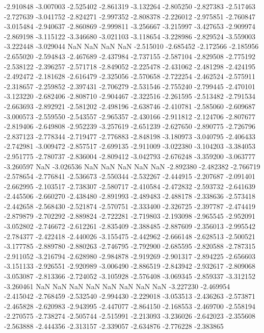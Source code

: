 -2.910848
-3.007003
-2.525402
-2.861319
-3.132264
-2.805250
-2.827383
-2.517463
-2.727639
-3.041752
-2.824271
-2.997352
-2.808378
-2.226012
-2.975851
-2.760847
-3.015484
-2.940637
-2.860869
-2.999811
-3.256667
-3.215997
-3.427653
-2.909974
-2.869198
-3.115122
-3.346680
-3.021103
-3.118654
-3.228986
-2.829524
-3.559003
-3.222448
-3.029044
NaN
NaN
NaN
NaN
-2.515010
-2.685452
-2.172566
-2.185956
-2.655020
-2.594843
-2.467689
-2.437984
-2.737155
-2.587104
-2.829508
-2.775192
-2.538122
-2.396257
-2.571718
-2.849052
-2.225478
-2.431062
-2.481298
-2.424195
-2.492472
-2.181628
-2.616479
-2.325056
-2.570658
-2.722254
-2.462524
-2.575911
-2.318657
-2.259852
-2.397431
-2.706279
-2.531546
-2.755240
-2.799445
-2.470101
-3.123220
-2.682406
-2.808710
-2.904467
-2.322516
-2.261595
-2.513482
-2.791534
-2.663693
-2.892921
-2.581202
-2.498196
-2.638746
-2.410781
-2.585060
-2.609687
-3.000573
-2.559550
-2.543557
-2.965357
-2.430166
-2.911812
-2.124706
-2.807677
-2.819406
-2.649808
-2.952239
-3.257619
-2.651239
-2.627650
-2.890775
-2.726796
-2.837123
-2.778344
-2.719477
-2.776883
-2.848198
-3.180973
-3.040795
-2.406433
-2.742981
-3.009472
-2.857517
-2.699135
-2.911009
-3.022380
-3.104203
-3.384053
-2.951775
-2.780737
-2.836004
-2.809412
-3.042793
-2.676248
-3.359200
-3.063777
-3.260597
NaN
-3.026536
NaN
NaN
NaN
NaN
NaN
-2.892380
-2.482382
-2.766719
-2.578654
-2.776841
-2.536673
-2.550344
-2.532267
-2.444915
-2.207687
-2.091401
-2.662995
-2.103517
-2.738307
-2.580717
-2.410584
-2.472832
-2.593732
-2.641639
-2.445506
-2.660270
-2.438480
-2.891993
-2.489483
-2.488178
-2.338636
-2.573418
-2.442658
-2.568430
-2.521874
-2.570751
-2.333400
-2.326725
-2.397787
-2.474419
-2.879879
-2.702292
-2.889824
-2.722281
-2.719803
-2.193098
-2.965545
-2.952091
-3.052802
-2.746672
-2.612261
-2.835409
-2.388485
-2.887609
-2.356013
-2.995542
-2.784377
-2.422418
-2.440026
-3.155475
-2.442962
-2.666148
-2.628513
-2.500521
-3.177785
-2.889780
-2.880263
-2.746795
-2.792900
-2.685595
-2.820588
-2.787315
-2.911052
-3.216794
-2.628980
-2.984878
-2.919269
-2.901317
-2.894225
-2.656603
-3.151133
-2.926551
-2.920989
-3.006490
-2.886519
-2.843942
-2.932617
-2.809068
-3.053087
-2.813366
-2.724052
-3.105928
-2.576408
-3.069345
-2.859337
-3.312152
-3.260461
NaN
NaN
NaN
NaN
NaN
NaN
NaN
NaN
-3.227230
-2.469954
-2.415042
-2.768459
-2.532540
-2.994430
-2.229018
-3.053513
-2.436263
-2.573871
-2.465828
-2.620983
-2.943995
-2.447077
-2.864150
-2.168553
-2.469700
-2.558194
-2.270575
-2.738274
-2.505744
-2.515991
-2.213093
-3.236026
-2.642023
-2.355608
-2.563888
-2.444356
-2.313157
-2.339057
-2.634876
-2.776228
-2.383865
